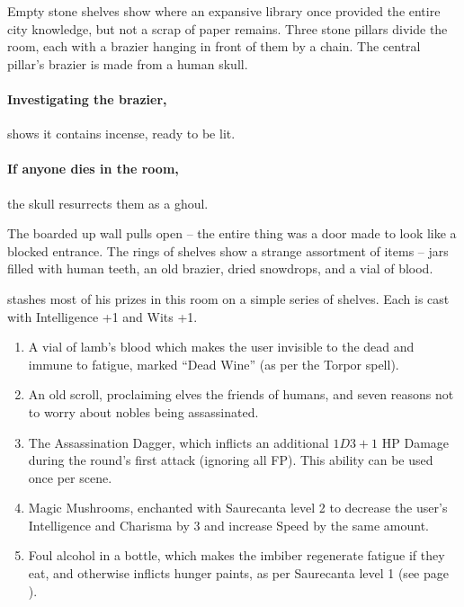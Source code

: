 \begin{multicols}{2}
\ghast

\ghoul

\label{oldlibrary}

\begin{boxtext}

  Empty stone shelves show where an expansive library once provided the entire city knowledge, but not a scrap of paper remains.
  Three stone pillars divide the room, each with a brazier hanging in front of them by a chain.
  The central pillar's brazier is made from a human skull.

\end{boxtext}

\paragraph{Investigating the brazier,}
shows it contains incense, ready to be lit.

\paragraph{If anyone dies in the room,}
the skull resurrects them as a ghoul.



\begin{boxtext}

  The boarded up wall pulls open -- the entire thing was a door made to look like a blocked entrance.  The rings of shelves show a strange assortment of items -- jars filled with human teeth, an old brazier, dried snowdrops, and a vial of blood.

\end{boxtext}

 stashes most of his prizes in this room on a simple series of shelves.
Each is cast with Intelligence +1 and Wits +1.

\begin{enumerate}

  \item
  A vial of lamb's blood which makes the user invisible to the dead and immune to fatigue, marked ``Dead Wine'' (as per the Torpor spell).
  \item
  An old scroll, proclaiming elves the friends of humans, and seven reasons not to worry about nobles being assassinated.
  \item
  The Assassination Dagger, which inflicts an additional $1D3+1$ HP Damage during the round's first attack (ignoring all FP).
  This ability can be used once per scene.
  \item
  Magic Mushrooms, enchanted with Saurecanta level 2 to decrease the user's Intelligence and Charisma by 3 and increase Speed by the same amount.
  \item
  Foul alcohol in a bottle, which makes the imbiber regenerate fatigue if they eat, and otherwise inflicts hunger paints, as per Saurecanta level 1 (see page \pageref{saurecantaone}).
\end{enumerate}


\end{multicols}
